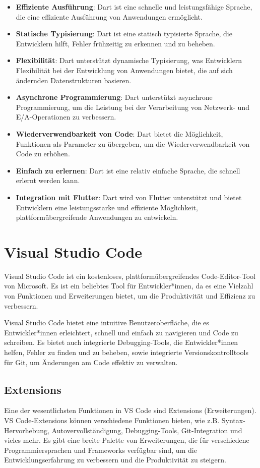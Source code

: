 \begin{itemize}
\item \textbf{Effiziente Ausführung}: Dart ist eine schnelle und leistungsfähige Sprache, die eine effiziente Ausführung von Anwendungen ermöglicht.
\item \textbf{Statische Typisierung}: Dart ist eine statisch typisierte Sprache, die Entwicklern hilft, Fehler frühzeitig zu erkennen und zu beheben.
\item \textbf{Flexibilität}: Dart unterstützt dynamische Typisierung, was Entwicklern Flexibilität bei der Entwicklung von Anwendungen bietet, die auf sich ändernden Datenstrukturen basieren.
\item \textbf{Asynchrone Programmierung}: Dart unterstützt asynchrone Programmierung, um die Leistung bei der Verarbeitung von Netzwerk- und E/A-Operationen zu verbessern.
\item \textbf{Wiederverwendbarkeit von Code}: Dart bietet die Möglichkeit, Funktionen als Parameter zu übergeben, um die Wiederverwendbarkeit von Code zu erhöhen.
\item \textbf{Einfach zu erlernen}: Dart ist eine relativ einfache Sprache, die schnell erlernt werden kann.
\item \textbf{Integration mit Flutter}: Dart wird von Flutter unterstützt und bietet Entwicklern eine leistungsstarke und effiziente Möglichkeit, plattformübergreifende Anwendungen zu entwickeln.
\end{itemize}

\pagebreak
\section{Visual Studio Code}
Visual Studio Code ist ein kostenloses, plattformübergreifendes Code-Editor-Tool von Microsoft. Es ist ein beliebtes Tool für Entwickler*innen, 
da es eine Vielzahl von Funktionen und Erweiterungen bietet, um die Produktivität und Effizienz zu verbessern.

Visual Studio Code bietet eine intuitive Benutzeroberfläche, die es Entwickler*innen erleichtert, schnell und einfach zu navigieren und Code zu schreiben. 
Es bietet auch integrierte Debugging-Tools, die Entwickler*innen helfen, Fehler zu finden und zu beheben, sowie integrierte Versionskontrolltools für Git, 
um Änderungen am Code effektiv zu verwalten.

\subsection{Extensions}
Eine der wesentlichsten Funktionen in VS Code sind Extensions (Erweiterungen). VS Code-Extensions können verschiedene Funktionen bieten, 
wie z.B. Syntax-Hervorhebung, Autovervollständigung, Debugging-Tools, Git-Integration und vieles mehr. 
Es gibt eine breite Palette von Erweiterungen, die für verschiedene Programmiersprachen und Frameworks verfügbar sind, 
um die Entwicklungserfahrung zu verbessern und die Produktivität zu steigern.


